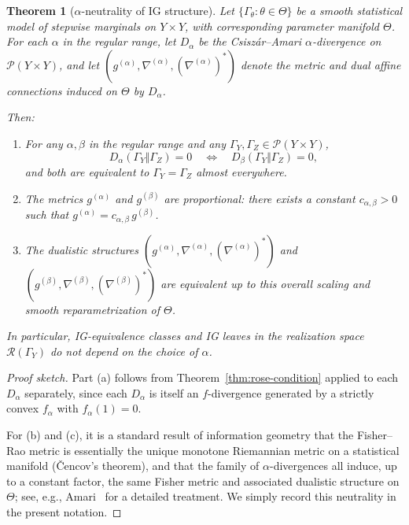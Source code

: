 \documentclass[11pt]{article}
\newtheorem{theorem}{Theorem}
\begin{document}
\begin{theorem}[$\alpha$-neutrality of IG structure]
\label{thm:alpha-neutrality}
Let $\{\Gamma_\theta : \theta\in\Theta\}$ be a smooth statistical model
of stepwise marginals on $Y\times Y$, with corresponding parameter
manifold $\Theta$. For each $\alpha$ in the regular range, let
$D_\alpha$ be the Csiszár--Amari $\alpha$-divergence on
$\mathcal{P}(Y\times Y)$, and let $(g^{(\alpha)},\nabla^{(\alpha)},
(\nabla^{(\alpha)})^\ast)$ denote the metric and dual affine connections
induced on $\Theta$ by $D_\alpha$.

Then:
\begin{enumerate}[label=(\alph*),leftmargin=1.8em]
  \item For any $\alpha,\beta$ in the regular range and any
  $\Gamma_Y,\Gamma_Z\in\mathcal{P}(Y\times Y)$,
  \[
    D_\alpha(\Gamma_Y\Vert\Gamma_Z)=0
    \quad\Longleftrightarrow\quad
    D_\beta(\Gamma_Y\Vert\Gamma_Z)=0,
  \]
  and both are equivalent to $\Gamma_Y=\Gamma_Z$ almost everywhere.
  \item The metrics $g^{(\alpha)}$ and $g^{(\beta)}$ are proportional:
  there exists a constant $c_{\alpha,\beta}>0$ such that
  $g^{(\alpha)} = c_{\alpha,\beta}\,g^{(\beta)}$.
  \item The dualistic structures
  $(g^{(\alpha)},\nabla^{(\alpha)},(\nabla^{(\alpha)})^\ast)$ and
  $(g^{(\beta)},\nabla^{(\beta)},(\nabla^{(\beta)})^\ast)$ are equivalent
  up to this overall scaling and smooth reparametrization of $\Theta$.
\end{enumerate}

In particular, IG-equivalence classes and IG leaves in the realization
space $\mathcal{R}(\Gamma_Y)$ do not depend on the choice of $\alpha$.
\end{theorem}

\begin{proof}[Proof sketch]
Part (a) follows from Theorem~\ref{thm:rose-condition} applied to each
$D_\alpha$ separately, since each $D_\alpha$ is itself an
$f$-divergence generated by a strictly convex $f_\alpha$ with
$f_\alpha(1)=0$.

For (b) and (c), it is a standard result of information geometry that
the Fisher--Rao metric is essentially the unique monotone Riemannian
metric on a statistical manifold (Čencov's theorem), and that the family
of $\alpha$-divergences all induce, up to a constant factor, the same
Fisher metric and associated dualistic structure on $\Theta$; see, e.g.,
Amari~\cite{Amari2016} for a detailed treatment. We simply
record this neutrality in the present notation.
\end{proof}
\end{document}
